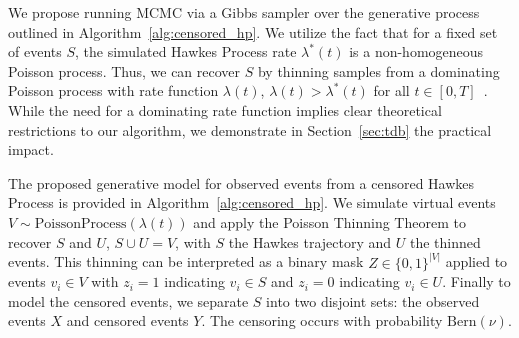 \documentclass[11pt]{article}
\newcommand{\algrule}[1][.2pt]{\par\vskip.5\baselineskip\hrule height #1\par\vskip.5\baselineskip}
\begin{document}
We propose running MCMC via a Gibbs sampler over the generative process outlined in Algorithm~\ref{alg:censored_hp}. We utilize the fact that for a fixed set of events $S$, the simulated Hawkes Process rate $\lambda^*(t)$ is a non-homogeneous Poisson process. Thus, we can recover $S$ by thinning samples from a dominating Poisson process with rate function $\lambda(t)$, $\lambda(t) > \lambda^*(t)$ for all $t \in [0,T]$~\cite{pthin}. While the need for a dominating rate function implies clear theoretical restrictions to our algorithm, we demonstrate in Section~\ref{sec:tdb} the practical impact.

The proposed generative model for observed events from a censored Hawkes Process is provided in Algorithm~\ref{alg:censored_hp}. We simulate virtual events $V\sim \text{PoissonProcess}(\lambda(t))$ and apply the Poisson Thinning Theorem to recover $S$ and $U$, $S \cup U = V$, with $S$ the Hawkes trajectory and $U$ the thinned events. This thinning can be interpreted as a binary mask $Z \in \{0,1\}^{|V|}$ applied to events $v_i \in V$ with $z_i = 1$ indicating $v_i \in S$ and $z_i = 0$ indicating $v_i \in U$. Finally to model the censored events, we separate $S$ into two disjoint sets: the observed events $X$ and censored events $Y$. The censoring occurs with probability $\text{Bern}(\nu)$. %

\end{document}
